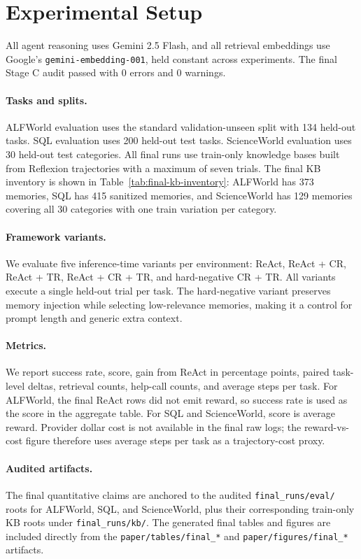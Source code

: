 \section{Experimental Setup}
\label{sec:experimental-setup}

All agent reasoning uses Gemini 2.5 Flash, and all retrieval embeddings use Google's \texttt{gemini-embedding-001}, held constant across experiments.
The final Stage C audit passed with 0 errors and 0 warnings.

\paragraph{Tasks and splits.}
ALFWorld evaluation uses the standard validation-unseen split with 134 held-out tasks.
SQL evaluation uses 200 held-out test tasks.
ScienceWorld evaluation uses 30 held-out test categories.
All final runs use train-only knowledge bases built from Reflexion trajectories with a maximum of seven trials.
The final KB inventory is shown in Table~\ref{tab:final-kb-inventory}: ALFWorld has 373 memories, SQL has 415 sanitized memories, and ScienceWorld has 129 memories covering all 30 categories with one train variation per category.

\paragraph{Framework variants.}
We evaluate five inference-time variants per environment: ReAct, ReAct + CR, ReAct + TR, ReAct + CR + TR, and hard-negative CR + TR.
All variants execute a single held-out trial per task.
The hard-negative variant preserves memory injection while selecting low-relevance memories, making it a control for prompt length and generic extra context.

\paragraph{Metrics.}
We report success rate, score, gain from ReAct in percentage points, paired task-level deltas, retrieval counts, help-call counts, and average steps per task.
For ALFWorld, the final ReAct rows did not emit reward, so success rate is used as the score in the aggregate table.
For SQL and ScienceWorld, score is average reward.
Provider dollar cost is not available in the final raw logs; the reward-vs-cost figure therefore uses average steps per task as a trajectory-cost proxy.

\paragraph{Audited artifacts.}
The final quantitative claims are anchored to the audited \texttt{final\_runs/eval/} roots for ALFWorld, SQL, and ScienceWorld, plus their corresponding train-only KB roots under \texttt{final\_runs/kb/}.
The generated final tables and figures are included directly from the \texttt{paper/tables/final\_*} and \texttt{paper/figures/final\_*} artifacts.
